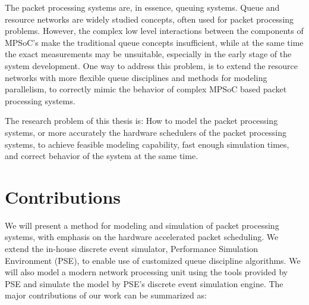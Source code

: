
The packet processing systems are, in essence, queuing systems. Queue and resource networks are widely studied concepts, often used for packet processing problems. However, the complex low level interactions between the components of MPSoC's make the traditional queue concepts insufficient, while at the same time the exact measurements may be unsuitable, especially in the early stage of the system development. One way to address this problem, is to extend the resource networks with more flexible queue disciplines and methods for modeling parallelism, to correctly mimic the behavior of complex MPSoC based packet processing systems.

The research problem of this thesis is: How to model the packet processing systems, or more accurately the hardware schedulers of the packet processing systems, to achieve feasible modeling capability, fast enough simulation times, and correct behavior of the system at the same time.

\section{Contributions}
We will present a method for modeling and simulation of packet processing systems, with emphasis on the hardware accelerated packet scheduling. We extend the in-house discrete event simulator, Performance Simulation Environment (PSE), to enable use of customized queue discipline algorithms. We will also model a modern network processing unit using the tools provided by PSE and simulate the model by PSE's discrete event simulation engine. The major contributions of our work can be summarized as:



